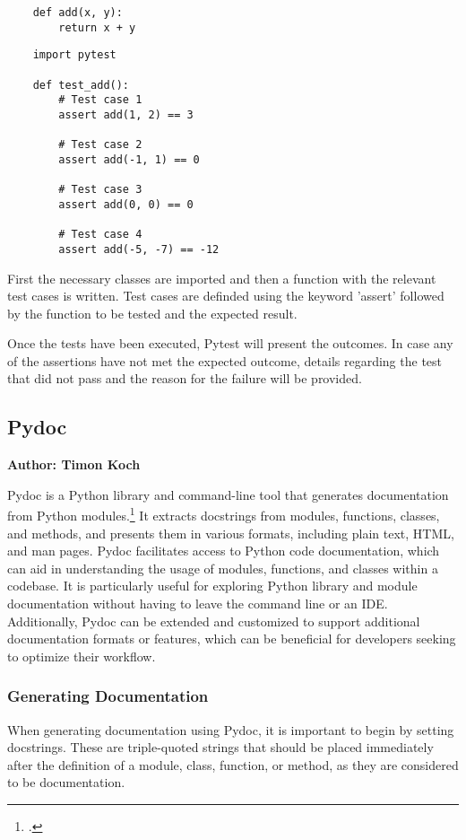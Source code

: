 \begin{verbatim} 
	def add(x, y):
    	return x + y
\end{verbatim}

\begin{verbatim} 
	import pytest

	def test_add():
    	# Test case 1
    	assert add(1, 2) == 3

    	# Test case 2
    	assert add(-1, 1) == 0

    	# Test case 3
    	assert add(0, 0) == 0

    	# Test case 4
    	assert add(-5, -7) == -12
\end{verbatim}

First the necessary classes are imported and then a function with the relevant test cases is written. Test cases are definded using the keyword 'assert' followed by the function to be tested  and the expected result. 

Once the tests have been executed, Pytest will present the outcomes. In case any of the assertions have not met the expected outcome, details regarding the test that did not pass and the reason for the failure will be provided.


\subsection{Pydoc}
\textbf{Author: Timon Koch}

Pydoc is a Python library and command-line tool that generates documentation from Python modules.\footcite{pydoc_git} It extracts docstrings from modules, functions, classes, and methods, and presents them in various formats, including plain text, HTML, and man pages.  Pydoc facilitates access to Python code documentation, which can aid in understanding the usage of modules, functions, and classes within a codebase. It is particularly useful for exploring Python library and module documentation without having to leave the command line or an IDE. Additionally, Pydoc can be extended and customized to support additional documentation formats or features, which can be beneficial for developers seeking to optimize their workflow. 

\subsubsection{Generating Documentation}
When generating documentation using Pydoc, it is important to begin by setting docstrings. These are triple-quoted strings that should be placed immediately after the definition of a module, class, function, or method, as they are considered to be documentation.

